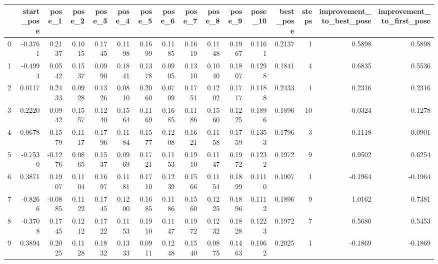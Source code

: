 \begin{tabular}{lrrrrrrrrrrrrrrr}
\toprule
{} &  start\_pose &  pose\_1 &  pose\_2 &  pose\_3 &  pose\_4 &  pose\_5 &  pose\_6 &  pose\_7 &  pose\_8 &  pose\_9 &  pose\_10 &  best\_pose &  steps &  improvement\_to\_best\_pose &  improvement\_to\_first\_pose \\
\midrule
0  &     -0.3761 &  0.2137 &  0.1015 &  0.1745 &  0.1198 &  0.1699 &  0.1185 &  0.1619 &  0.1148 &  0.1967 &   0.1161 &     0.2137 &      1 &                    0.5898 &                     0.5898 \\
1  &     -0.4994 &  0.0542 &  0.1537 &  0.0990 &  0.1841 &  0.1378 &  0.0905 &  0.1310 &  0.1040 &  0.1807 &   0.1298 &     0.1841 &      4 &                    0.6835 &                     0.5536 \\
2  &      0.0117 &  0.2433 &  0.0928 &  0.1326 &  0.0810 &  0.2060 &  0.0709 &  0.1751 &  0.1202 &  0.1717 &   0.1188 &     0.2433 &      1 &                    0.2316 &                     0.2316 \\
3  &      0.2220 &  0.0942 &  0.1557 &  0.1240 &  0.1564 &  0.1169 &  0.1685 &  0.1186 &  0.1560 &  0.1225 &   0.1896 &     0.1896 &     10 &                   -0.0324 &                    -0.1278 \\
4  &      0.0678 &  0.1579 &  0.1117 &  0.1796 &  0.1184 &  0.1577 &  0.1208 &  0.1621 &  0.1158 &  0.1759 &   0.1353 &     0.1796 &      3 &                    0.1118 &                     0.0901 \\
5  &     -0.7530 & -0.1276 &  0.0865 &  0.1537 &  0.0969 &  0.1721 &  0.1153 &  0.1910 &  0.1147 &  0.1972 &   0.1232 &     0.1972 &      9 &                    0.9502 &                     0.6254 \\
6  &      0.3871 &  0.1907 &  0.1104 &  0.1697 &  0.1181 &  0.1710 &  0.1239 &  0.1566 &  0.1154 &  0.1899 &   0.1110 &     0.1907 &      1 &                   -0.1964 &                    -0.1964 \\
7  &     -0.8266 & -0.0885 &  0.1122 &  0.1745 &  0.1200 &  0.1685 &  0.1186 &  0.1560 &  0.1225 &  0.1896 &   0.1112 &     0.1896 &      9 &                    1.0162 &                     0.7381 \\
8  &     -0.3708 &  0.1745 &  0.1212 &  0.1722 &  0.1153 &  0.1910 &  0.1147 &  0.1972 &  0.1232 &  0.1828 &   0.1223 &     0.1972 &      7 &                    0.5680 &                     0.5453 \\
9  &      0.3894 &  0.2025 &  0.1128 &  0.1832 &  0.1333 &  0.0911 &  0.1248 &  0.1540 &  0.0875 &  0.1463 &   0.1062 &     0.2025 &      1 &                   -0.1869 &                    -0.1869 \\

\end{tabular}
